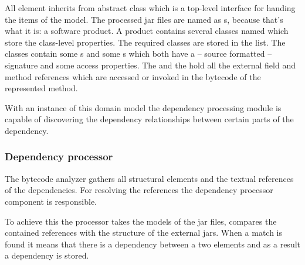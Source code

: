 All element inherits from abstract  class which is a top-level
interface for handing the items of the model. The processed jar files are named
as s, because that's what it is: a software product. A product
contains several classes named  which store the class-level
properties. The required classes are stored in the 
list. The classes contain some s and some s which both
have a -- source formatted -- signature and some access properties. The
 and the  hold all the external
field and method references which are accessed or invoked in the bytecode of the
represented method.

With an instance of this domain model the dependency processing module is
capable of discovering the dependency relationships between certain parts of the
dependency.
 

\subsubsection{Dependency processor}
The bytecode analyzer gathers all structural elements and the textual references
of the dependencies. For resolving the references the dependency processor
component is responsible.

To achieve this the processor takes the models of the jar files, compares the
contained references with the structure of the external jars. When a match is
found it means that there is a dependency between a two elements and as a result
a dependency is stored.

